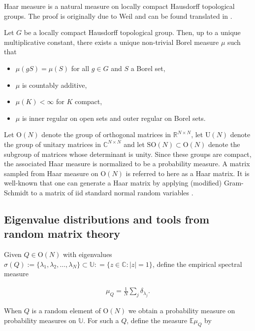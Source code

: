 Haar measure is a natural measure on locally compact Hausdorff topological groups.  The proof is originally due to Weil \cite{Weil1951} and can be found translated in \cite{Nachbin1976}.

\begin{theorem}
Let $G$ be a locally compact Hausdorff topological group.  Then, up to a unique multiplicative constant, there exists a unique non-trivial Borel measure $\mu$ such that
\begin{itemize}
\item $\mu(gS)= \mu(S)$ for all $g \in G$ and $S$ a Borel set, \item $\mu$ is countably additive, \item $\mu(K) < \infty$ for $K$ compact, \item $\mu$ is inner regular on open sets and outer regular on Borel sets.
\end{itemize}
\end{theorem}

Let $\mathrm{O}(N)$ denote the group of orthogonal matrices in $\mathbb R^{N \times N}$, let $\mathrm{U}(N)$ denote the group of unitary matrices in $\mathbb C^{N\times N}$ and let $\mathrm{SO}(N) \subset \mathrm{O}(N)$ denote the subgroup of matrices whose determinant is unity.  Since these groups are compact, the associated Haar measure is normalized to be a probability measure.  A matrix sampled from Haar measure on $\mathrm{O}(N)$ is referred to here as a Haar matrix.  It is well-known that one can generate a Haar matrix by applying (modified) Gram-Schmidt to a matrix of iid standard normal random variables \cite{Forrester2010,Mezzadri2006,Stewart1980}.

\subsection{Eigenvalue distributions and tools from random matrix theory}

Given $Q \in \mathrm O (N)$ with eigenvalues $\sigma(Q):= \{\lambda_1,\lambda_2,\ldots, \lambda_N\} \subset \mathbb U : = \{z \in \mathbb C : |z| = 1\}$, define the empirical spectral measure

\begin{align}
\mu_Q = \frac{1}{N} \sum_{j} \delta_{\lambda_j}.
\end{align}

When $Q$ is a random element of $\mathrm O(N)$ we obtain a probability measure on probability measures on $\mathbb U$.  For such a $Q$, define the measure $\mathbb E \mu_Q$ by

